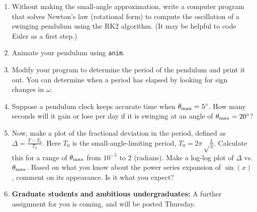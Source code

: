\documentclass[12pt]{article}
\begin{document}
\begin{enumerate}
{\begin{enumerate}

\item{Without making the small-angle approximation, 
write a computer program that solves Newton's law (rotational form) to compute the oscillation of a swinging pendulum using the RK2 algorithm. (It may be helpful to code Euler as a first step.)}

\item{Animate your pendulum using {\tt anim}.}

\item{Modify your program to determine the period of the pendulum and print it out. You can determine when a period has elapsed by looking for sign changes in $\omega$.}

\item{Suppose a pendulum clock keeps accurate time when $\theta_{\rm max}=5^\circ$. How many seconds will it gain or lose per day if it is swinging at an angle of  $\theta_{\rm max}=20^\circ$?}

\item{Now, make a plot of the fractional deviation in the period, defined as $\Delta = \frac{T-T_0}{T_0}$. Here $T_0$ is the small-angle-limiting period, $T_0=2\pi\sqrt\frac{L}{g}$. Calculate this for a range of $\theta_{\rm max}$ from $10^{-5}$ to 2 (radians). Make a log-log plot of $\Delta$ vs. $\theta_{\rm max}$.
Based on what you know about the power series expansion of $\sin(x)$, comment on its appearance. Is it what you expect?}

\item{{\bf Graduate students and ambitious undergraduates:} A further assignment for you is coming, and will be posted Thursday.


}
\end{enumerate}}
\end{enumerate}
\end{document}
